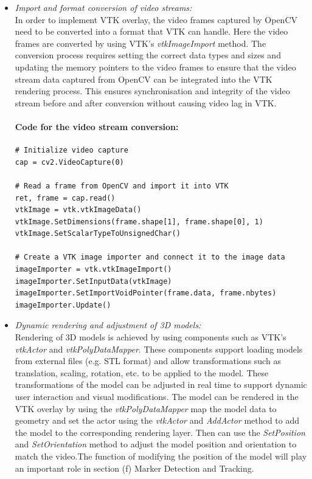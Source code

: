 \documentclass[12pt]{article}
\begin{document}
\begin{enumerate}
\begin{enumerate}
\begin{itemize}
                              \item \textit{Import and format conversion of video streams:}
                                    \\
                                    In order to implement VTK overlay, the video frames captured by OpenCV need to be converted into a format that VTK can handle. Here the video frames are converted by using VTK's \emph{vtkImageImport} method. The conversion process requires setting the correct data types and sizes and updating the memory pointers to the video frames to ensure that the video stream data captured from OpenCV can be integrated into the VTK rendering process. This ensures synchronisation and integrity of the video stream before and after conversion without causing video lag in VTK.\cite{vtk_image_import_doc,vtk_image_import_2023}
                                    \paragraph{Code for the video stream conversion:}
                                    \begin{verbatim}
# Initialize video capture
cap = cv2.VideoCapture(0)

# Read a frame from OpenCV and import it into VTK
ret, frame = cap.read()
vtkImage = vtk.vtkImageData()
vtkImage.SetDimensions(frame.shape[1], frame.shape[0], 1)
vtkImage.SetScalarTypeToUnsignedChar()

# Create a VTK image importer and connect it to the image data
imageImporter = vtk.vtkImageImport()
imageImporter.SetInputData(vtkImage)
imageImporter.SetImportVoidPointer(frame.data, frame.nbytes)
imageImporter.Update()
                              \end{verbatim}
                              \item \textit{Dynamic rendering and adjustment of 3D models:}
                                    \\
                                    Rendering of 3D models is achieved by using components such as VTK's \emph{vtkActor} and \emph{vtkPolyDataMapper}. These components support loading models from external files (e.g. STL format) and allow transformations such as translation, scaling, rotation, etc. to be applied to the model. These transformations of the model can be adjusted in real time to support dynamic user interaction and visual modifications\cite{6037214}. The model can be rendered in the VTK overlay by using the \emph{vtkPolyDataMapper} map the model data to geometry and set the actor using the \emph{vtkActor} and \emph{AddActor} method to add the model to the corresponding rendering layer. Then can use the \emph{SetPosition} and \emph{SetOrientation} method to adjust the model position and orientation to match the video\cite{5357714}.The function of modifying the position of the model will play an important role in section (f) Marker Detection and Tracking. 

\end{itemize}
\end{enumerate}
\end{enumerate}
\end{document}

